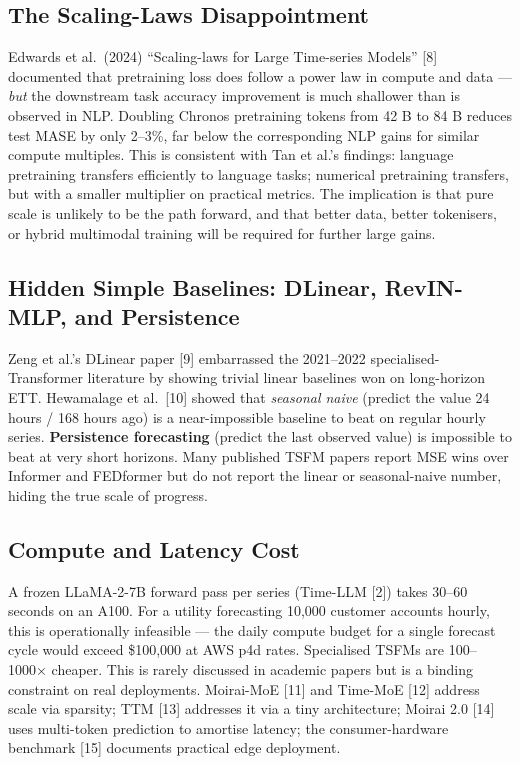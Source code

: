 \documentclass{article}
\begin{document}
\subsection{The Scaling-Laws Disappointment}\label{the-scaling-laws-disappointment}

Edwards et al.~(2024) ``Scaling-laws for Large Time-series Models'' {[}8{]} documented that pretraining loss does follow a power law in compute and data --- \emph{but} the downstream task accuracy improvement is much shallower than is observed in NLP. Doubling Chronos pretraining tokens from 42 B to 84 B reduces test MASE by only 2--3\%, far below the corresponding NLP gains for similar compute multiples. This is consistent with Tan et al.'s findings: language pretraining transfers efficiently to language tasks; numerical pretraining transfers, but with a smaller multiplier on practical metrics. The implication is that pure scale is unlikely to be the path forward, and that better data, better tokenisers, or hybrid multimodal training will be required for further large gains.

\subsection{Hidden Simple Baselines: DLinear, RevIN-MLP, and Persistence}\label{hidden-simple-baselines-dlinear-revin-mlp-and-persistence}

Zeng et al.'s DLinear paper {[}9{]} embarrassed the 2021--2022 specialised-Transformer literature by showing trivial linear baselines won on long-horizon ETT. Hewamalage et al.~{[}10{]} showed that \emph{seasonal naive} (predict the value 24 hours / 168 hours ago) is a near-impossible baseline to beat on regular hourly series. \textbf{Persistence forecasting} (predict the last observed value) is impossible to beat at very short horizons. Many published TSFM papers report MSE wins over Informer and FEDformer but do not report the linear or seasonal-naive number, hiding the true scale of progress.

\subsection{Compute and Latency Cost}\label{compute-and-latency-cost}

A frozen LLaMA-2-7B forward pass per series (Time-LLM {[}2{]}) takes 30--60 seconds on an A100. For a utility forecasting 10,000 customer accounts hourly, this is operationally infeasible --- the daily compute budget for a single forecast cycle would exceed \$100,000 at AWS p4d rates. Specialised TSFMs are 100--1000× cheaper. This is rarely discussed in academic papers but is a binding constraint on real deployments. Moirai-MoE {[}11{]} and Time-MoE {[}12{]} address scale via sparsity; TTM {[}13{]} addresses it via a tiny architecture; Moirai 2.0 {[}14{]} uses multi-token prediction to amortise latency; the consumer-hardware benchmark {[}15{]} documents practical edge deployment.
\end{document}
